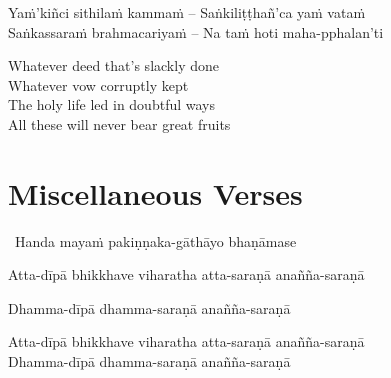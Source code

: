 \begin{verses}
  Yaṁ'kiñci sithilaṁ kammaṁ – Saṅkiliṭṭhañ'ca yaṁ vataṁ\\
  Saṅkassaraṁ brahmacariyaṁ – Na taṁ hoti maha-pphalan'ti
\end{verses}

\fi

\begin{english-verses}
  Whatever deed that's slackly done\\
  Whatever vow corruptly kept\\
  The holy life led in doubtful ways\\
  All these will never bear great fruits
\end{english-verses}

\suttaRef{[SN 2.8]}

\ifdigital{}\fi



\section{Miscellaneous Verses}
\label{misc-verses}

\begin{leader}
  \anglebracketleft\ \hspace{-0.5mm}Handa mayaṁ pakiṇṇaka-gāthāyo bhaṇāmase \hspace{-0.5mm}\anglebracketright\
\end{leader}

\ifninebythirteen

\begin{pali-hang-verses}
  Atta-dīpā bhikkhave viharatha atta-saraṇā anañña-saraṇā\\
\end{pali-hang-verses}
\begin{pali-hang-together}
  Dhamma-dīpā dhamma-saraṇā anañña-saraṇā
\end{pali-hang-together}

\else

\begin{verses}
  Atta-dīpā bhikkhave viharatha atta-saraṇā anañña-saraṇā\\
  Dhamma-dīpā dhamma-saraṇā anañña-saraṇā
\end{verses}

\fi

\ifninebythirteen

